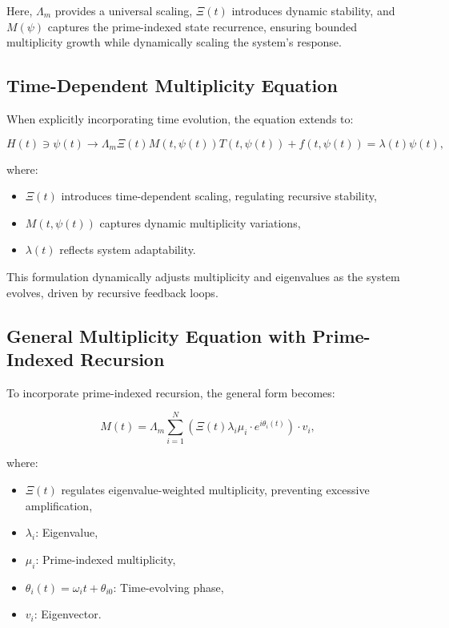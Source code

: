 \documentclass[12pt]{article}
\theoremstyle{plain}
\begin{document}
Here, \(\Lambda_m\) provides a universal scaling, \(\Xi(t)\) introduces dynamic stability, and \(M(\psi)\) captures the prime-indexed state recurrence, ensuring bounded multiplicity growth while dynamically scaling the system’s response.

\subsection{Time-Dependent Multiplicity Equation}

When explicitly incorporating time evolution, the equation extends to:

\begin{equation}
H(t) \ni \psi(t) \rightarrow \Lambda_m \Xi(t) M(t, \psi(t)) T(t, \psi(t)) + f(t, \psi(t)) = \lambda(t) \psi(t),
\end{equation}

where:
\begin{itemize}
    \item \(\Xi(t)\) introduces time-dependent scaling, regulating recursive stability,
    \item \( M(t, \psi(t)) \) captures dynamic multiplicity variations,
    \item \( \lambda(t) \) reflects system adaptability.
\end{itemize}

This formulation dynamically adjusts multiplicity and eigenvalues as the system evolves, driven by recursive feedback loops.

\subsection{General Multiplicity Equation with Prime-Indexed Recursion}

To incorporate prime-indexed recursion, the general form becomes:

\begin{equation}
M(t) = \Lambda_m \sum_{i=1}^N \left( \Xi(t) \lambda_i \mu_i \cdot e^{i\theta_i(t)} \right) \cdot v_i,
\end{equation}

where:
\begin{itemize}
    \item \(\Xi(t)\) regulates eigenvalue-weighted multiplicity, preventing excessive amplification,
    \item \( \lambda_i \): Eigenvalue,
    \item \( \mu_i \): Prime-indexed multiplicity,
    \item \( \theta_i(t) = \omega_i t + \theta_{i0} \): Time-evolving phase,
    \item \( v_i \): Eigenvector.
\end{itemize}
\end{document}
